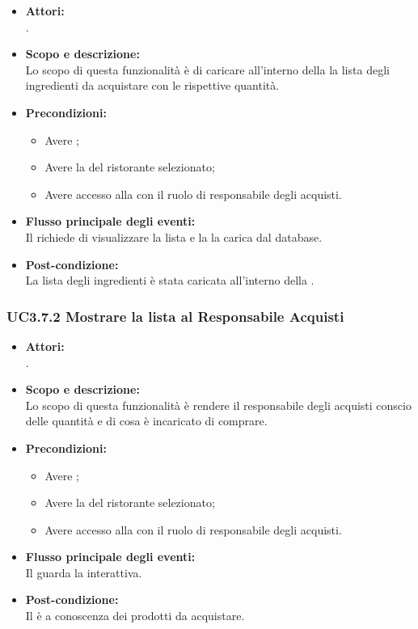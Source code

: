 \begin{itemize}
	\item \textbf{Attori:}
	\\.
	\item \textbf{Scopo e descrizione:} 
	\\Lo scopo di questa funzionalità è di caricare all'interno della  la lista degli ingredienti da acquistare con le rispettive quantità.
	\item \textbf{Precondizioni:}
	\begin{itemize}
		\item Avere ;
		\item Avere la  del ristorante selezionato;
		\item Avere accesso alla  con il ruolo di responsabile degli acquisti.
	\end{itemize}
	\item \textbf{Flusso principale degli eventi:}
	\\Il {} richiede di visualizzare la lista e la  la carica dal database.
	\item \textbf{Post-condizione:}
	\\La lista degli ingredienti è stata caricata all'interno della .
\end{itemize}

\subsubsection{UC3.7.2 Mostrare la lista al Responsabile Acquisti} \label{UC3.7.2}

\begin{itemize}
	\item \textbf{Attori:}
	\\.
	\item \textbf{Scopo e descrizione:} 
	\\Lo scopo di questa funzionalità è rendere il responsabile degli acquisti conscio delle quantità e di cosa è incaricato di comprare.
	\item \textbf{Precondizioni:}
	\begin{itemize}
		\item Avere ;
		\item Avere la  del ristorante selezionato;
		\item Avere accesso alla  con il ruolo di responsabile degli acquisti.
	\end{itemize}
	\item \textbf{Flusso principale degli eventi:}
	\\Il {} guarda la  interattiva.
	\item \textbf{Post-condizione:}
	\\Il {} è a conoscenza dei prodotti da acquistare.
\end{itemize}

